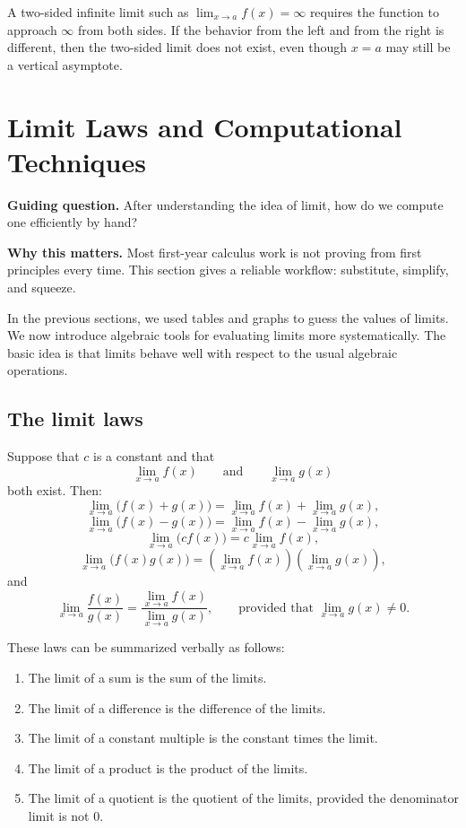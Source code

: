 \begin{remark}
A two-sided infinite limit such as \(\displaystyle \lim_{x\to a}f(x)=\infty\) requires the function to approach \(\infty\) from both sides. If the behavior from the left and from the right is different, then the two-sided limit does not exist, even though \(x=a\) may still be a vertical asymptote.
\end{remark}

\section{Limit Laws and Computational Techniques}

\begin{remark}
\textbf{Guiding question.} After understanding the idea of limit, how do we compute one efficiently by hand?

\textbf{Why this matters.} Most first-year calculus work is not proving from first principles every time. This section gives a reliable workflow: substitute, simplify, and squeeze.
\end{remark}

In the previous sections, we used tables and graphs to guess the values of limits. We now introduce algebraic tools for evaluating limits more systematically. The basic idea is that limits behave well with respect to the usual algebraic operations.

\subsection{The limit laws}

\begin{theorem}
Suppose that \(c\) is a constant and that
\[
\lim_{x\to a}f(x)
\qquad \text{and} \qquad
\lim_{x\to a}g(x)
\]
both exist. Then:
\[
\lim_{x\to a}\bigl(f(x)+g(x)\bigr)
=
\lim_{x\to a}f(x)+\lim_{x\to a}g(x),
\]
\[
\lim_{x\to a}\bigl(f(x)-g(x)\bigr)
=
\lim_{x\to a}f(x)-\lim_{x\to a}g(x),
\]
\[
\lim_{x\to a}\bigl(c f(x)\bigr)
=
c\lim_{x\to a}f(x),
\]
\[
\lim_{x\to a}\bigl(f(x)g(x)\bigr)
=
\left(\lim_{x\to a}f(x)\right)\left(\lim_{x\to a}g(x)\right),
\]
and
\[
\lim_{x\to a}\frac{f(x)}{g(x)}
=
\frac{\lim_{x\to a}f(x)}{\lim_{x\to a}g(x)},
\qquad
\text{provided that } \lim_{x\to a}g(x)\ne 0.
\]
\end{theorem}

\begin{remark}
These laws can be summarized verbally as follows:
\begin{enumerate}
    \item The limit of a sum is the sum of the limits.
    \item The limit of a difference is the difference of the limits.
    \item The limit of a constant multiple is the constant times the limit.
    \item The limit of a product is the product of the limits.
    \item The limit of a quotient is the quotient of the limits, provided the denominator limit is not \(0\).
\end{enumerate}
\end{remark}

